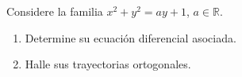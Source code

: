 Considere la familia $x^2+y^2=ay+1$, $a\in\mathbb R$.

\begin{enumerate}[label=(\alph*),ref=\alph*,leftmargin=*]
\item Determine su ecuación diferencial asociada.
\item Halle sus trayectorias ortogonales.
\end{enumerate}
